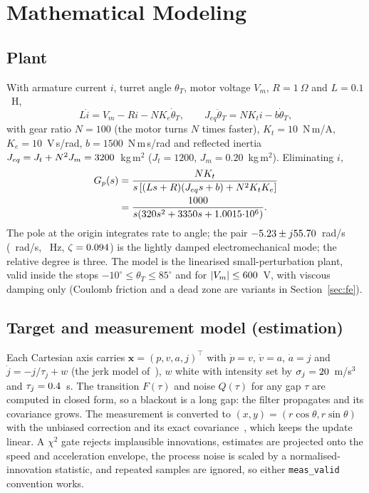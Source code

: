 \documentclass[conference]{IEEEtran}
\begin{document}
\section{Mathematical Modeling}
\subsection{Plant}
With armature current $i$, turret angle $\theta_T$, motor voltage $V_m$, $R=1~\Omega$ and $L=0.1$~H,
\begin{equation}
L\dot i=V_m-Ri-NK_e\dot\theta_T,\qquad J_{eq}\ddot\theta_T=NK_ti-b\dot\theta_T,
\end{equation}
with gear ratio $N=100$ (the motor turns $N$ times faster), $K_t=10$~N\,m/A, $K_e=10$~V\,s/rad, $b=1500$~N\,m\,s/rad and reflected inertia $J_{eq}=J_t+N^2J_m=3200$~kg\,m$^2$ ($J_t=1200$, $J_m=0.20$~kg\,m$^2$). Eliminating $i$,
\begin{equation}
\begin{split}
G_p(s)&=\frac{NK_t}{s\left[(Ls+R)(J_{eq}s+b)+N^2K_tK_e\right]}\\
&=\frac{1000}{s(320 s^2+3350 s+1.0015{\cdot}10^{6})}.
\end{split}
\end{equation}
The pole at the origin integrates rate to angle; the pair $-5.23\pm j55.70$~rad/s (\PlWn~rad/s, \PlHz~Hz, $\zeta=0.094$) is the lightly damped electromechanical mode; the relative degree is three. The model is the linearised small-perturbation plant, valid inside the stops $-10^\circ\le\theta_T\le85^\circ$ and for $|V_m|\le600$~V, with viscous damping only (Coulomb friction and a dead zone are variants in Section~\ref{sec:fe}).

\subsection{Target and measurement model (estimation)}
Each Cartesian axis carries $\mathbf x=(p,v,a,j)^\top$ with $\dot p=v$, $\dot v=a$, $\dot a=j$ and $\dot j=-j/\tau_j+w$ (the jerk model of~\cite{mehrotra}), $w$ white with intensity set by $\sigma_j=20$~m/s$^3$ and $\tau_j=0.4$~s. The transition $F(\tau)$ and noise $Q(\tau)$ for any gap $\tau$ are computed in closed form, so a blackout is a long gap: the filter propagates and its covariance grows. The measurement is converted to $(x,y)=(r\cos\theta,r\sin\theta)$ with the unbiased correction and its exact covariance~\cite{barshalom,lerro}, which keeps the update linear. A $\chi^2$ gate rejects implausible innovations, estimates are projected onto the speed and acceleration envelope, the process noise is scaled by a normalised-innovation statistic, and repeated samples are ignored, so either \texttt{meas\_valid} convention works.
\end{document}
